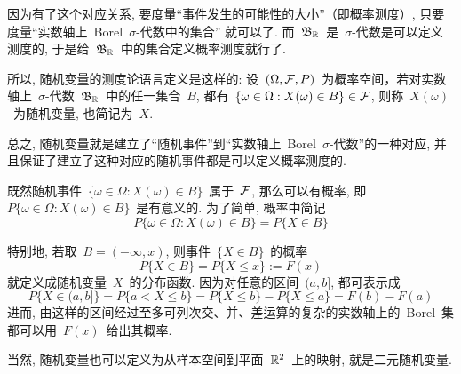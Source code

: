 因为有了这个对应关系, 要度量``事件发生的可能性的大小''（即概率测度）, 只要度量``实数轴上~Borel~$\sigma$-代数中的集合'' 就可以了. 而~$\mathfrak{B}_{\mathbb{R}}$~是~$\sigma$-代数是可以定义测度的, 于是给~$\mathfrak{B}_{\mathbb{R}}$~中的集合定义概率测度就行了.

所以, 随机变量的测度论语言定义是这样的: 设~$(\Omega,\mathcal{F},P)$~为概率空间，若对实数轴上~$\sigma$-代数~$\mathfrak{B}_{\mathbb{R}}$~中的任一集合~$B$, 都有~$\{ \omega \in \Omega: X(\omega) \in B\} \in \mathcal{F}$, 则称~$X(\omega)$~为随机变量, 也简记为~$X$.

总之, 随机变量就是建立了``随机事件''到``实数轴上~Borel~$\sigma$-代数''的一种对应, 并且保证了建立了这种对应的随机事件都是可以定义概率测度的. 

既然随机事件~$\{\omega \in \Omega: X(\omega) \in B\}$~属于~$\mathcal{F}$, 那么可以有概率, 即~$P\{\omega \in \Omega: X(\omega) \in B\}$~是有意义的. 为了简单, 概率中简记
\[
P\{\omega \in \Omega: X(\omega) \in B\} = P\{X \in B\}
\] 

特别地, 若取~$B=(-\infty,x)$, 则事件~$\{X \in B\}$~的概率
\[
P\{X \in B\} = P\{X \leqslant x\} := F(x)
\]
就定义成随机变量~$X$~的分布函数. 因为对任意的区间~$(a,b]$, 都可表示成
\[
P\{X \in (a,b] \} = P\{a < X \leqslant b\} = P\{X \leqslant b\} - P\{X \leqslant a\} = F(b)-F(a)
\]
进而, 由这样的区间经过至多可列次交、并、差运算的复杂的实数轴上的~Borel~集都可以用~$F(x)$~给出其概率.

当然, 随机变量也可以定义为从样本空间到平面~$\mathbb{R}^2$~上的映射, 就是二元随机变量.

